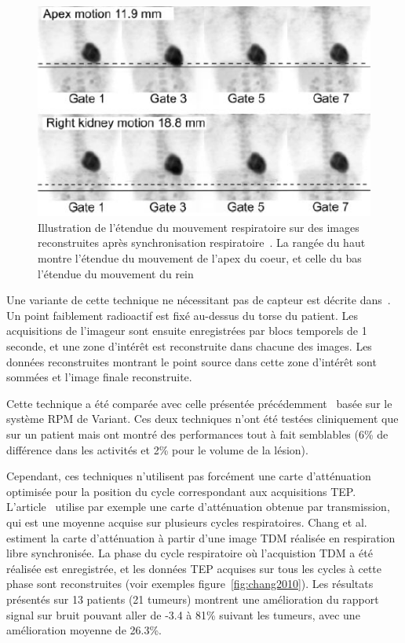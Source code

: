 \begin{figure}[h!]
	\begin{center}
		\includegraphics[width=12cm]{images/gatingBoucher2004}
	\end{center}
	\caption[Illustration de l'étendue du mouvement respiratoire sur des images reconstruites ]{Illustration de l'étendue du mouvement respiratoire sur des images reconstruites après synchronisation respiratoire~\cite{boucher2004respiratory}. La rangée du haut montre l'étendue du mouvement de l'apex du coeur, et celle du bas l'étendue du mouvement du rein} 
	\label{fig:boucher2004}
\end{figure}

Une variante de cette technique ne nécessitant pas de capteur est décrite dans~\cite{nehmeh2003reduction}. Un point faiblement radioactif est fixé au-dessus du torse du patient. Les acquisitions de l'imageur sont ensuite enregistrées par blocs temporels de 1 seconde, et une zone d'intérêt est reconstruite dans chacune des images. Les données reconstruites montrant le point source dans cette zone d'intérêt sont sommées et l'image finale reconstruite. 

Cette technique a été comparée avec celle présentée précédemment~\cite{nehmeh2002effect} basée sur le système RPM de Variant. Ces deux techniques n'ont été testées cliniquement que sur un patient mais ont montré des performances tout à fait semblables (6\% de différence dans les activités et 2\% pour le volume de la lésion).

Cependant, ces techniques n'utilisent pas forcément une carte d'atténuation optimisée pour la position du cycle correspondant aux acquisitions TEP. L'article~\cite{boucher2004respiratory} utilise par exemple une carte d'atténuation obtenue par transmission, qui est une moyenne acquise sur plusieurs cycles respiratoires. Chang et al.~\cite{GuopingChang2010Implementation} estiment la carte d'atténuation à partir d'une image TDM réalisée en respiration libre synchronisée. La phase du cycle respiratoire où l'acquistion TDM a été réalisée est enregistrée, et les données TEP acquises sur tous les cycles à cette phase sont reconstruites (voir exemples figure~\ref{fig:chang2010}). Les résultats présentés sur 13 patients (21 tumeurs) montrent une amélioration du rapport signal sur bruit pouvant aller de -3.4 à 81\% suivant les tumeurs, avec une amélioration moyenne de 26.3\%.

